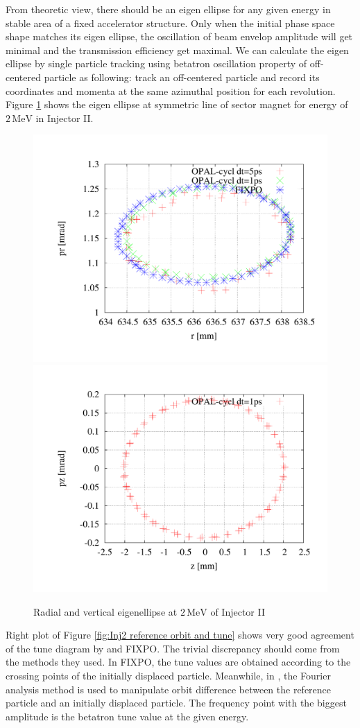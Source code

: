 From theoretic view, there should be an eigen ellipse for any given energy in stable area of a fixed accelerator structure. Only when the initial phase space
shape matches its eigen ellipse, the oscillation of beam envelop amplitude will get minimal and the transmission efficiency get maximal.
We can calculate the eigen ellipse by single particle tracking using betatron oscillation property of off-centered particle as following: track 
an off-centered particle and record its coordinates and momenta at the same azimuthal position for each revolution.    
Figure \ref{fig:eigen} shows the eigen ellipse at symmetric line of sector magnet for energy of $2\,\mathrm{MeV}$ in Injector II.
\begin{figure}[ht]
 \begin{center} 
   \includegraphics[width=0.45\linewidth,angle=0]{figures/cyclotron/RadialEigen_Inj2}
   \includegraphics[width=0.45\linewidth,angle=0]{figures/cyclotron/VertEigen_Inj2}
   \caption{Radial and vertical eigenellipse at $2\,\mathrm{MeV}$ of Injector II}   
   \label{fig:eigen}
 \end{center}
\end{figure}
 
Right plot of Figure \ref{fig:Inj2 reference orbit and tune} shows very good agreement of the tune diagram by \opalcycl and FIXPO.
The trivial discrepancy should come from the methods they used.
In FIXPO, the tune values are obtained according to the crossing points of the initially displaced particle. Meanwhile, in \opalcycl, the Fourier 
analysis method is used to manipulate orbit difference between the reference particle and an initially displaced particle.
The frequency point with the biggest amplitude is the betatron tune value at the given energy.


